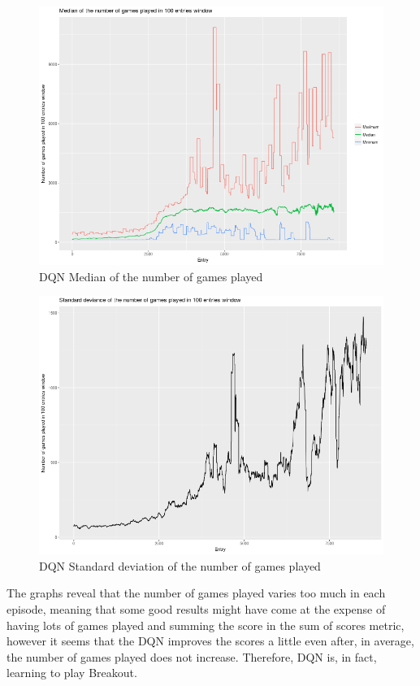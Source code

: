\documentclass[11pt,twoside,a4paper]{article}
\begin{document}
\begin{figure}[H]
  \includegraphics[scale=0.35]{log-analysis/dqn-median-ngp.png}
  \centering
  \caption{DQN Median of the number of games played}
  \label{fig:dqn-median-ngp}
\end{figure}

\begin{figure}[H]
  \includegraphics[scale=0.35]{log-analysis/dqn-sd-ngp.png}
  \centering
  \caption{DQN Standard deviation of the number of games played}
  \label{fig:dqn-sd-ngp}
\end{figure}

The graphs reveal that the number of games played varies too much in each episode,
meaning that some good results might have come at the expense of having lots of
games played and summing the score in the sum of scores metric, however it seems
that the DQN improves the scores a little even after, in average, the number of
games played does not increase. Therefore, DQN is, in fact, learning to play
Breakout.
\end{document}
